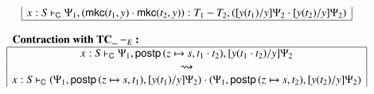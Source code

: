 \documentclass{lmcs}
\newcommand{\DualLNLLogicnt}[1]{\mathit{#1}}
\newcommand{\DualLNLLogicmv}[1]{\mathit{#1}}
\newcommand{\DualLNLLogicsym}[1]{#1}
\newcommand{\DualLNLLogicdrulename}[1]{\textsc{#1}}
\newcommand{\DualLNLLogicdruleTCXXsubEName}[0]{\DualLNLLogicdrulename{TC\_subE}}
\renewcommand{\DualLNLLogicdrulename}[1]{#1}
\renewcommand{\DualLNLLogicdruleTCXXsubEName}{\text{TC\_}-_E}
\begin{document}
\begin{figure}
\begin{mdframed}
\begin{center}
\begin{math}
\begin{array}{c}
\begin{array}{|c|}
         \DualLNLLogicmv{x}  :  \DualLNLLogicnt{S}  \vdash_{\mathsf{C} }  \Psi_{{\mathrm{1}}}  \DualLNLLogicsym{,}  \DualLNLLogicsym{(}    \mathsf{mkc}( \DualLNLLogicnt{t_{{\mathrm{1}}}} , \DualLNLLogicmv{y} )   \cdot   \mathsf{mkc}( \DualLNLLogicnt{t_{{\mathrm{2}}}} , \DualLNLLogicmv{y} )    \DualLNLLogicsym{)}  \DualLNLLogicsym{:}   \DualLNLLogicnt{T_{{\mathrm{1}}}}  -  \DualLNLLogicnt{T_{{\mathrm{2}}}}   \DualLNLLogicsym{,}  \DualLNLLogicsym{(}  \DualLNLLogicsym{[}  \DualLNLLogicmv{y}  \DualLNLLogicsym{(}  \DualLNLLogicnt{t_{{\mathrm{1}}}}  \DualLNLLogicsym{)}  \DualLNLLogicsym{/}  \DualLNLLogicmv{y}  \DualLNLLogicsym{]}  \Psi_{{\mathrm{2}}}  \cdot  \DualLNLLogicsym{[}  \DualLNLLogicmv{y}  \DualLNLLogicsym{(}  \DualLNLLogicnt{t_{{\mathrm{2}}}}  \DualLNLLogicsym{)}  \DualLNLLogicsym{/}  \DualLNLLogicmv{y}  \DualLNLLogicsym{]}  \Psi_{{\mathrm{2}}}  \DualLNLLogicsym{)} \\
        \hline
      \end{array}\\
      \\
      \begin{array}{|c|}
        \multicolumn{1}{l}{\textbf{\textbf{Contraction with $\DualLNLLogicdruleTCXXsubEName{}$}:}}\\
        \hline
         \DualLNLLogicmv{x}  :  \DualLNLLogicnt{S}  \vdash_{\mathsf{C} }  \Psi_{{\mathrm{1}}}  \DualLNLLogicsym{,}    \mathsf{postp}\,( \DualLNLLogicmv{z}  \mapsto  \DualLNLLogicnt{s} ,   \DualLNLLogicnt{t_{{\mathrm{1}}}}  \cdot  \DualLNLLogicnt{t_{{\mathrm{2}}}}  )    \DualLNLLogicsym{,}  \DualLNLLogicsym{[}  \DualLNLLogicmv{y}  \DualLNLLogicsym{(}   \DualLNLLogicnt{t_{{\mathrm{1}}}}  \cdot  \DualLNLLogicnt{t_{{\mathrm{2}}}}   \DualLNLLogicsym{)}  \DualLNLLogicsym{/}  \DualLNLLogicmv{y}  \DualLNLLogicsym{]}  \Psi_{{\mathrm{2}}} \\
        \rightsquigarrow\\
         \DualLNLLogicmv{x}  :  \DualLNLLogicnt{S}  \vdash_{\mathsf{C} }  \DualLNLLogicsym{(}  \Psi_{{\mathrm{1}}}  \DualLNLLogicsym{,}    \mathsf{postp}\,( \DualLNLLogicmv{z}  \mapsto  \DualLNLLogicnt{s} ,  \DualLNLLogicnt{t_{{\mathrm{1}}}} )    \DualLNLLogicsym{,}  \DualLNLLogicsym{[}  \DualLNLLogicmv{y}  \DualLNLLogicsym{(}  \DualLNLLogicnt{t_{{\mathrm{1}}}}  \DualLNLLogicsym{)}  \DualLNLLogicsym{/}  \DualLNLLogicmv{y}  \DualLNLLogicsym{]}  \Psi_{{\mathrm{2}}}  \DualLNLLogicsym{)}  \cdot  \DualLNLLogicsym{(}  \Psi_{{\mathrm{1}}}  \DualLNLLogicsym{,}    \mathsf{postp}\,( \DualLNLLogicmv{z}  \mapsto  \DualLNLLogicnt{s} ,  \DualLNLLogicnt{t_{{\mathrm{2}}}} )    \DualLNLLogicsym{,}  \DualLNLLogicsym{[}  \DualLNLLogicmv{y}  \DualLNLLogicsym{(}  \DualLNLLogicnt{t_{{\mathrm{2}}}}  \DualLNLLogicsym{)}  \DualLNLLogicsym{/}  \DualLNLLogicmv{y}  \DualLNLLogicsym{]}  \Psi_{{\mathrm{2}}}  \DualLNLLogicsym{)} \\

\end{array}
\end{array}
\end{math}
\end{center}
\end{mdframed}
\end{figure}
\end{document}
